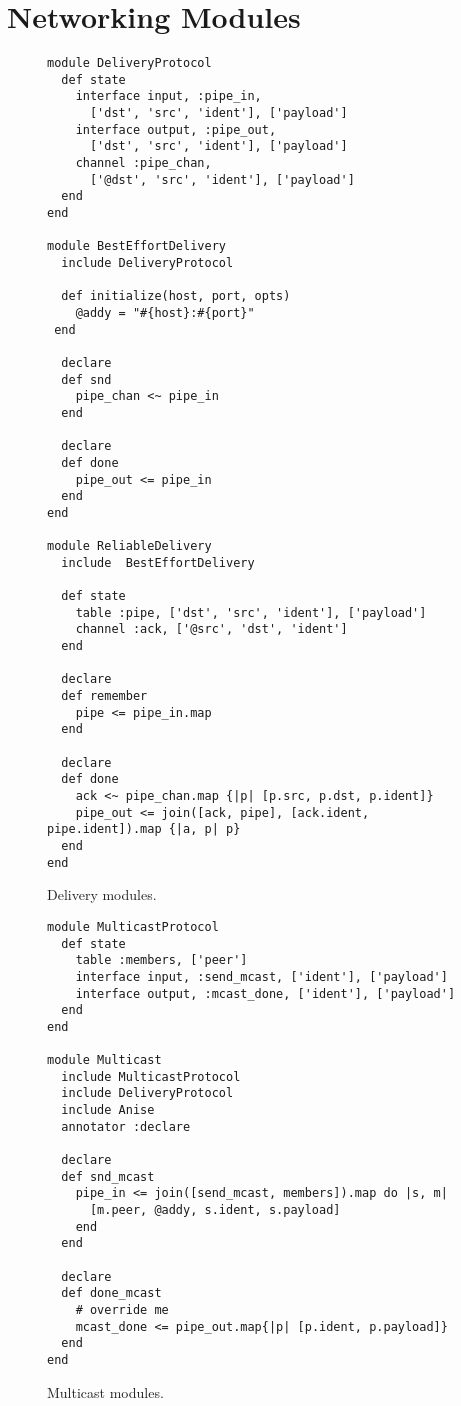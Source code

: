 \section{Networking Modules}

\begin{figure}[t]
\begin{scriptsize}
\begin{lstlisting}
module DeliveryProtocol
  def state
    interface input, :pipe_in,
      ['dst', 'src', 'ident'], ['payload']
    interface output, :pipe_out,
      ['dst', 'src', 'ident'], ['payload']
    channel :pipe_chan,
      ['@dst', 'src', 'ident'], ['payload']
  end
end

module BestEffortDelivery
  include DeliveryProtocol

  def initialize(host, port, opts)
    @addy = "#{host}:#{port}"
 end

  declare
  def snd
    pipe_chan <~ pipe_in
  end

  declare
  def done
    pipe_out <= pipe_in
  end
end

module ReliableDelivery
  include  BestEffortDelivery

  def state
    table :pipe, ['dst', 'src', 'ident'], ['payload']
    channel :ack, ['@src', 'dst', 'ident']
  end

  declare
  def remember
    pipe <= pipe_in.map
  end

  declare
  def done
    ack <~ pipe_chan.map {|p| [p.src, p.dst, p.ident]}
    pipe_out <= join([ack, pipe], [ack.ident, pipe.ident]).map {|a, p| p}
  end
end
\end{lstlisting}
\centering
\vspace{-10pt}
\caption{Delivery modules.}
\label{fig:kvs-impl}
\end{scriptsize}
\vspace{-2pt}
\end{figure}


\begin{figure}[t]
\begin{scriptsize}
\begin{lstlisting}
module MulticastProtocol
  def state
    table :members, ['peer']
    interface input, :send_mcast, ['ident'], ['payload']
    interface output, :mcast_done, ['ident'], ['payload']
  end
end

module Multicast
  include MulticastProtocol
  include DeliveryProtocol
  include Anise
  annotator :declare

  declare
  def snd_mcast
    pipe_in <= join([send_mcast, members]).map do |s, m|
      [m.peer, @addy, s.ident, s.payload]
    end
  end

  declare
  def done_mcast
    # override me
    mcast_done <= pipe_out.map{|p| [p.ident, p.payload]}
  end
end
\end{lstlisting}
\centering
\vspace{-10pt}
\caption{Multicast modules.}
\label{fig:kvs-impl}
\end{scriptsize}
\vspace{-2pt}
\end{figure}
